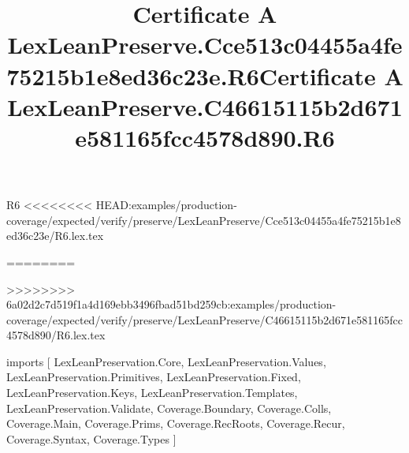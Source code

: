 \begin{lexlean}{R6}
<<<<<<<< HEAD:examples/production-coverage/expected/verify/preserve/LexLeanPreserve/Cce513c04455a4fe75215b1e8ed36c23e/R6.lex.tex
\title{Certificate A LexLeanPreserve.Cce513c04455a4fe75215b1e8ed36c23e.R6}
========
\title{Certificate A LexLeanPreserve.C46615115b2d671e581165fcc4578d890.R6}
>>>>>>>> 6a02d2c7d519f1a4d169ebb3496fbad51bd259cb:examples/production-coverage/expected/verify/preserve/LexLeanPreserve/C46615115b2d671e581165fcc4578d890/R6.lex.tex
\begin{coremodule}
imports [
  LexLeanPreservation.Core,
  LexLeanPreservation.Values,
  LexLeanPreservation.Primitives,
  LexLeanPreservation.Fixed,
  LexLeanPreservation.Keys,
  LexLeanPreservation.Templates,
  LexLeanPreservation.Validate,
  Coverage.Boundary,
  Coverage.Colls,
  Coverage.Main,
  Coverage.Prims,
  Coverage.RecRoots,
  Coverage.Recur,
  Coverage.Syntax,
  Coverage.Types
]


\end{coremodule}
\end{lexlean}

